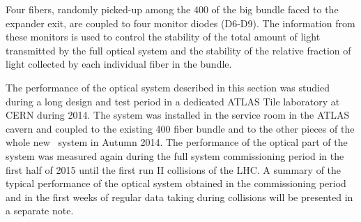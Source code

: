 Four fibers, randomly picked-up among the 400 of the big bundle faced to the
expander exit, are coupled to four monitor diodes (D6-D9). The information from
these monitors is used to control the stability of the total amount of light
transmitted by the full optical system and the stability of the relative fraction of
light collected by each individual fiber in the bundle.

The performance of the optical system described in this section was studied during
a long design and test period in a dedicated ATLAS Tile laboratory at CERN during 2014. The system was installed in the service room in the
ATLAS cavern and coupled to the existing 400 fiber bundle and to the other pieces of
the whole new \lasii~system in Autumn 2014. The performance of the optical
part of the system was measured again during the full system commissioning period
in the first half of 2015 until the first run II collisions of the LHC. A summary of
the typical performance of the optical system obtained in the commissioning period
and in the first weeks of regular data taking during collisions will be presented in a separate note.

